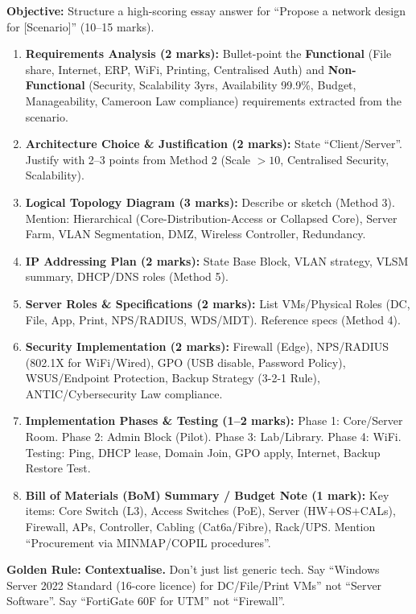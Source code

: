 \documentclass[11pt]{article}
\begin{document}
\begin{methode}
\textbf{Objective:} Structure a high-scoring essay answer for ``Propose a network design for [Scenario]'' (10--15 marks).

\begin{enumerate}
    \item \textbf{Requirements Analysis (2 marks):} Bullet-point the \textbf{Functional} (File share, Internet, ERP, WiFi, Printing, Centralised Auth) and \textbf{Non-Functional} (Security, Scalability 3yrs, Availability 99.9\%, Budget, Manageability, Cameroon Law compliance) requirements extracted from the scenario.
    \item \textbf{Architecture Choice \& Justification (2 marks):} State ``Client/Server''. Justify with 2--3 points from Method 2 (Scale $>10$, Centralised Security, Scalability).
    \item \textbf{Logical Topology Diagram (3 marks):} Describe or sketch (Method 3). Mention: Hierarchical (Core-Distribution-Access or Collapsed Core), Server Farm, VLAN Segmentation, DMZ, Wireless Controller, Redundancy.
    \item \textbf{IP Addressing Plan (2 marks):} State Base Block, VLAN strategy, VLSM summary, DHCP/DNS roles (Method 5).
    \item \textbf{Server Roles \& Specifications (2 marks):} List VMs/Physical Roles (DC, File, App, Print, NPS/RADIUS, WDS/MDT). Reference specs (Method 4).
    \item \textbf{Security Implementation (2 marks):} Firewall (Edge), NPS/RADIUS (802.1X for WiFi/Wired), GPO (USB disable, Password Policy), WSUS/Endpoint Protection, Backup Strategy (3-2-1 Rule), ANTIC/Cybersecurity Law compliance.
    \item \textbf{Implementation Phases \& Testing (1--2 marks):} Phase 1: Core/Server Room. Phase 2: Admin Block (Pilot). Phase 3: Lab/Library. Phase 4: WiFi. Testing: Ping, DHCP lease, Domain Join, GPO apply, Internet, Backup Restore Test.
    \item \textbf{Bill of Materials (BoM) Summary / Budget Note (1 mark):} Key items: Core Switch (L3), Access Switches (PoE), Server (HW+OS+CALs), Firewall, APs, Controller, Cabling (Cat6a/Fibre), Rack/UPS. Mention ``Procurement via MINMAP/COPIL procedures''.
\end{enumerate}
\textbf{Golden Rule:} \textbf{Contextualise.} Don't just list generic tech. Say ``Windows Server 2022 Standard (16-core licence) for DC/File/Print VMs'' not ``Server Software''. Say ``FortiGate 60F for UTM'' not ``Firewall''.
\end{methode}
\end{document}
